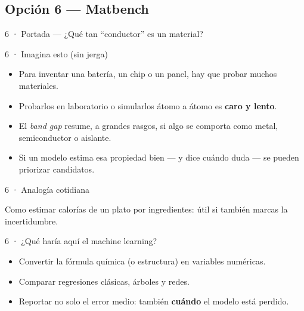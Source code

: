 \subsection{Opción 6 --- Matbench}

\begin{frame}{6 · Portada --- ¿Qué tan ``conductor'' es un material?}
\end{frame}

\begin{frame}{6 · Imagina esto (sin jerga)}
  \begin{itemize}
    \item Para inventar una batería, un chip o un panel, hay que probar muchos materiales.
    \item Probarlos en laboratorio o simularlos átomo a átomo es \textbf{caro y lento}.
    \item El \emph{band gap} resume, a grandes rasgos, si algo se comporta como metal, semiconductor o aislante.
    \item Si un modelo estima esa propiedad bien --- y dice cuándo duda --- se pueden priorizar candidatos.
  \end{itemize}
\end{frame}

\begin{frame}{6 · Analogía cotidiana}
  \begin{center}
  \end{center}
  \vspace{0.35em}
  Como estimar calorías de un plato por ingredientes: útil si también marcas la incertidumbre.
\end{frame}

\begin{frame}{6 · ¿Qué haría aquí el machine learning?}
  \begin{itemize}
    \item Convertir la fórmula química (o estructura) en variables numéricas.
    \item Comparar regresiones clásicas, árboles y redes.
    \item Reportar no solo el error medio: también \textbf{cuándo} el modelo está perdido.
  \end{itemize}
\end{frame}

